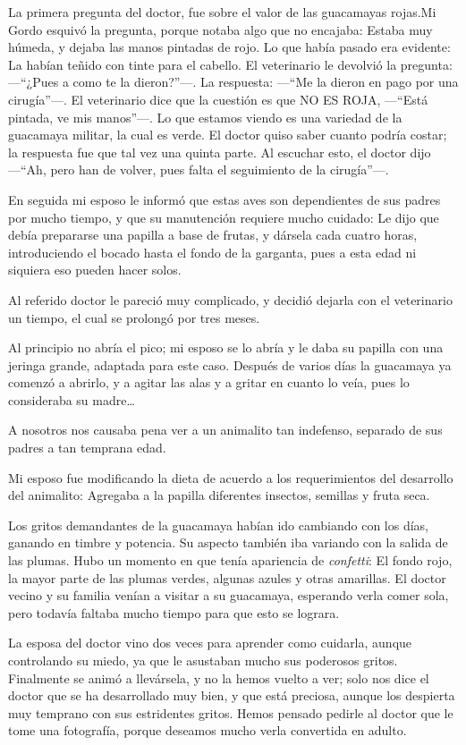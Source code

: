\documentclass[letterpaper, 12pt]{book}
\begin{document}
La primera pregunta del doctor, fue sobre el valor de las guacamayas rojas.Mi Gordo esquivó la pregunta, porque notaba algo que no encajaba: Estaba muy húmeda, y dejaba las manos pintadas de rojo. Lo que había pasado era evidente: La habían teñido con tinte para el cabello. El veterinario le devolvió la pregunta: ---``¿Pues a como te la dieron?''---. La respuesta: ---``Me la dieron en pago por una cirugía''---. El veterinario dice que la cuestión es que NO ES ROJA, ---``Está pintada, ve mis manos''---. Lo que estamos viendo es una variedad de la guacamaya militar, la cual es verde. El doctor quiso saber cuanto podría costar; la respuesta fue que tal vez una quinta parte. Al escuchar esto, el doctor dijo ---``Ah, pero han de volver, pues falta el seguimiento de la cirugía''---.

En seguida mi esposo le informó que estas aves son dependientes de sus padres por mucho tiempo, y que su manutención requiere mucho cuidado: Le dijo que debía prepararse una papilla a base de frutas, y dársela cada cuatro horas, introduciendo el bocado hasta el fondo de la garganta, pues a esta edad ni siquiera eso pueden hacer solos.

Al referido doctor le pareció muy complicado, y decidió dejarla con el veterinario un tiempo, el cual se prolongó por tres meses. 

Al principio no abría el pico; mi esposo se lo abría y le daba su papilla con una jeringa grande, adaptada para este caso. Después de varios días la guacamaya ya comenzó a abrirlo, y a agitar las alas y a gritar en cuanto lo veía, pues lo consideraba su madre\ldots

A nosotros nos causaba pena ver a un animalito tan indefenso, separado de sus padres a tan temprana edad. 

Mi esposo fue modificando la dieta de acuerdo a los requerimientos del desarrollo del animalito: Agregaba a la papilla diferentes insectos, semillas y fruta seca. 

Los gritos demandantes de la guacamaya habían ido cambiando con los días, ganando en timbre y potencia. Su aspecto también iba variando con la salida de las plumas. Hubo un momento en que tenía apariencia de \textit{confetti}: El fondo rojo, la mayor parte de las plumas verdes, algunas azules y otras amarillas. El doctor vecino y su familia venían a visitar a su guacamaya, esperando verla comer sola, pero todavía faltaba mucho tiempo para que esto se lograra. 

La esposa del doctor vino dos veces para aprender como cuidarla, aunque controlando su miedo, ya que le asustaban mucho sus poderosos gritos. Finalmente se animó a llevársela, y no la hemos vuelto a ver; solo nos dice el doctor que se ha desarrollado muy bien, y que está preciosa, aunque los despierta muy temprano con sus estridentes gritos. Hemos pensado pedirle al doctor que le tome una fotografía, porque deseamos mucho verla convertida en adulto.
\end{document}
